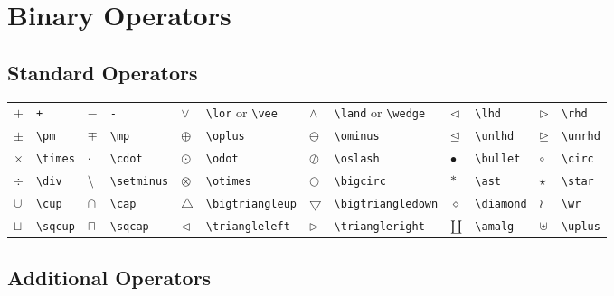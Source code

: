 \documentclass[10pt, english]{article}
\begin{document}
\section{Binary Operators}

	\subsection{Standard Operators}

	\begin{center}
		\scriptsize
	\begin{tabular}{ll|ll|ll|ll|ll|ll}
		$+$ & \verb|+| & $-$ & \verb|-| & $\lor$ & \verb|\lor| or \verb|\vee| & $\land$ & \verb|\land| or \verb|\wedge| & $\lhd$ & \verb|\lhd| & $\rhd$ & \verb|\rhd| \\ 
		$\pm$ & \verb|\pm| & $\mp$ & \verb|\mp| & $\oplus$ & \verb|\oplus| & $\ominus$ & \verb|\ominus| & $\unlhd$ & \verb|\unlhd| & $\unrhd$ & \verb|\unrhd| \\
		$\times$ & \verb|\times| & $\cdot$ & \verb|\cdot| & $\odot$ & \verb|\odot| & $\oslash$ & \verb|\oslash| & $\bullet$ & \verb|\bullet| & $\circ$ & \verb|\circ| \\
		$\div$ & \verb|\div| & $\setminus$ & \verb|\setminus| & $\otimes$ & \verb|\otimes| & $\bigcirc$ & \verb|\bigcirc| & $\ast$ & \verb|\ast| & $\star$ & \verb|\star| \\
		$\cup$ & \verb|\cup| & $\cap$ & \verb|\cap| & $\bigtriangleup$ & \verb|\bigtriangleup| & $\bigtriangledown$ & \verb|\bigtriangledown| & $\diamond$ & \verb|\diamond| & $\wr$ & \verb|\wr| \\ 
		$\sqcup$ & \verb|\sqcup| & $\sqcap$ & \verb|\sqcap| & $\triangleleft$ & \verb|\triangleleft| & $\triangleright$ & \verb|\triangleright| & $\amalg$ & \verb|\amalg| & $\uplus$ & \verb|\uplus| \\
	\end{tabular}
	\end{center}

\newpage

	\subsection{Additional Operators}
\end{document}
